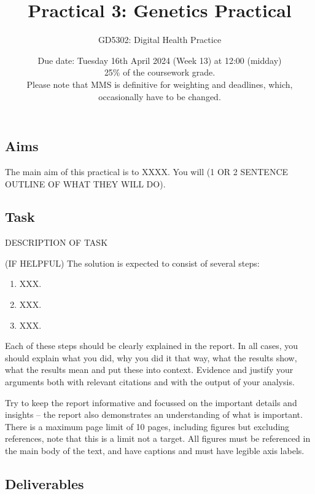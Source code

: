 \documentclass[a4paper,11pt]{article}
\begin{document}
\title{Practical 3: Genetics Practical}
\author{GD5302: Digital Health Practice}
\date{Due date: Tuesday 16th April 2024 (Week 13) at 12:00 (midday)\\
25\% of the coursework grade.\\
Please note that MMS is definitive for weighting and deadlines, which, occasionally have to be changed.} 

\maketitle

\subsection*{Aims}

The main aim of this practical is to XXXX. 
You will (1 OR 2 SENTENCE OUTLINE OF WHAT THEY WILL DO). 

\subsection*{Task}
DESCRIPTION OF TASK

(IF HELPFUL) The solution is expected to consist of several steps:
\begin{enumerate}
\item XXX.
\item XXX.
\item XXX.
\

\end{enumerate}
Each of these steps should be clearly explained in the report. 
In all cases, you should explain what you did, why you did it that way, what the results show, what the results mean and put these into context. Evidence and justify your arguments both with relevant citations and with the output of your analysis.

Try to keep the report informative and focussed on the important details and insights -- the report also demonstrates an understanding of what is important. 
There is a maximum page limit of 10 pages, including figures but excluding references, note that this is a limit not a target. All figures must be referenced in the main body of the text, and have captions and must have legible axis labels.

\subsection*{Deliverables}
\end{document}
